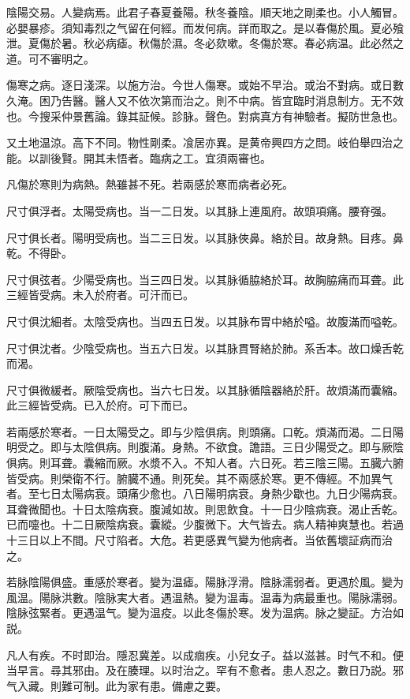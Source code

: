 \documentclass[b5paper,twoside,zihao=-4,UTF8]{ctexbook}
\begin{document}
陰陽交易。人變病焉。此君子春夏養陽。秋冬養陰。順天地之剛柔也。小人觸冒。必嬰暴疹。須知毒烈之气留在何經。而发何病。詳而取之。是以春傷於風。夏必飱泄。夏傷於暑。秋必病瘧。秋傷於濕。冬必欬嗽。冬傷於寒。春必病温。此必然之道。可不審明之。

傷寒之病。逐日淺深。以施方治。今世人傷寒。或始不早治。或治不對病。或日數久淹。困乃告醫。醫人又不依次第而治之。則不中病。皆宜臨时消息制方。无不效也。今搜采仲景舊論。錄其証候。診脉。聲色。對病真方有神驗者。擬防世急也。

又土地温涼。高下不同。物性剛柔。飡居亦異。是黄帝興四方之問。岐伯舉四治之能。以訓後賢。開其未悟者。臨病之工。宜須兩審也。

凡傷於寒則为病熱。熱雖甚不死。若兩感於寒而病者必死。

尺寸俱浮者。太陽受病也。当一二日发。以其脉上連風府。故頭項痛。腰脊强。

尺寸俱长者。陽明受病也。当二三日发。以其脉俠鼻。絡於目。故身熱。目疼。鼻乾。不得卧。

尺寸俱弦者。少陽受病也。当三四日发。以其脉循脇絡於耳。故胸脇痛而耳聋。此三經皆受病。未入於府者。可汗而已。

尺寸俱沈細者。太陰受病也。当四五日发。以其脉布胃中絡於嗌。故腹滿而嗌乾。

尺寸俱沈者。少陰受病也。当五六日发。以其脉貫腎絡於肺。系舌本。故口燥舌乾而渴。

尺寸俱微緩者。厥陰受病也。当六七日发。以其脉循陰器絡於肝。故煩滿而囊縮。此三經皆受病。已入於府。可下而已。

若兩感於寒者。一日太陽受之。即与少陰俱病。則頭痛。口乾。煩滿而渴。二日陽明受之。即与太陰俱病。則腹滿。身熱。不欲食。譫語。三日少陽受之。即与厥陰俱病。則耳聋。囊縮而厥。水漿不入。不知人者。六日死。若三陰三陽。五臓六腑皆受病。則榮衛不行。腑臓不通。則死矣。其不兩感於寒。更不傳經。不加異气者。至七日太陽病衰。頭痛少愈也。八日陽明病衰。身熱少歇也。九日少陽病衰。耳聋微聞也。十日太陰病衰。腹減如故。則思飲食。十一日少陰病衰。渴止舌乾。已而嚏也。十二日厥陰病衰。囊縱。少腹微下。大气皆去。病人精神爽慧也。若過十三日以上不間。尺寸陷者。大危。若更感異气變为他病者。当依舊壞証病而治之。

若脉陰陽俱盛。重感於寒者。變为温瘧。陽脉浮滑。陰脉濡弱者。更遇於風。變为風温。陽脉洪數。陰脉実大者。遇温熱。變为温毒。温毒为病最重也。陽脉濡弱。陰脉弦緊者。更遇温气。變为温疫。以此冬傷於寒。发为温病。脉之變証。方治如説。

凡人有疾。不时即治。隱忍冀差。以成痼疾。小兒女子。益以滋甚。时气不和。便当早言。尋其邪由。及在腠理。以时治之。罕有不愈者。患人忍之。數日乃説。邪气入藏。則難可制。此为家有患。備慮之要。
\end{document}
